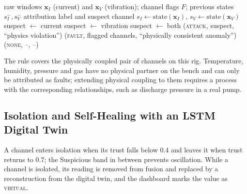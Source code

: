 \begin{algorithm}[H]
\caption{Operating-state attribution for one window}
\label{alg:attribution}
\begin{algorithmic}[1]
\Require raw windows $\mathbf{x}_{I}$ (current) and $\mathbf{x}_{V}$ (vibration); channel flags $F$; previous states $s_I^{-}, s_V^{-}$
\Ensure attribution label and suspect channel
\State $s_I \gets \mathrm{state}(\mathbf{x}_I)$, \; $s_V \gets \mathrm{state}(\mathbf{x}_V)$
   \State suspect $\gets$ current
   \State suspect $\gets$ vibration
  \Else \State suspect $\gets$ both
  \EndIf
  \State \Return (\textsc{attack}, suspect, ``physics violation'')
  \State \Return (\textsc{fault}, flagged channels, ``physically consistent anomaly'')
\Else
  \State \Return (\textsc{none}, --, --)
\EndIf
\end{algorithmic}
\end{algorithm}

The rule covers the physically coupled pair of channels on this rig. Temperature, humidity, pressure and gas have no physical partner on the bench and can only be attributed as faults; extending physical coupling to them requires a process with the corresponding relationships, such as discharge pressure in a real pump.

\subsection{Isolation and Self-Healing with an LSTM Digital Twin}

A channel enters isolation when its trust falls below 0.4 and leaves it when trust returns to 0.7; the Suspicious band in between prevents oscillation. While a channel is isolated, its reading is removed from fusion and replaced by a reconstruction from the digital twin, and the dashboard marks the value as \textsc{virtual}.

